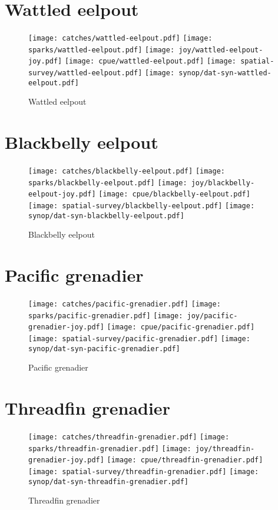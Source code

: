 \section*{Wattled eelpout}

\begin{figure}[htbp]
\centering
\texttt{[image: catches/wattled-eelpout.pdf]}
\texttt{[image: sparks/wattled-eelpout.pdf]}
\texttt{[image: joy/wattled-eelpout-joy.pdf]}
\texttt{[image: cpue/wattled-eelpout.pdf]}
\texttt{[image: spatial-survey/wattled-eelpout.pdf]}
\texttt{[image: synop/dat-syn-wattled-eelpout.pdf]}
\caption{Wattled eelpout}
\end{figure}
\clearpage
\section*{Blackbelly eelpout}

\begin{figure}[htbp]
\centering
\texttt{[image: catches/blackbelly-eelpout.pdf]}
\texttt{[image: sparks/blackbelly-eelpout.pdf]}
\texttt{[image: joy/blackbelly-eelpout-joy.pdf]}
\texttt{[image: cpue/blackbelly-eelpout.pdf]}
\texttt{[image: spatial-survey/blackbelly-eelpout.pdf]}
\texttt{[image: synop/dat-syn-blackbelly-eelpout.pdf]}
\caption{Blackbelly eelpout}
\end{figure}
\clearpage
\section*{Pacific grenadier}

\begin{figure}[htbp]
\centering
\texttt{[image: catches/pacific-grenadier.pdf]}
\texttt{[image: sparks/pacific-grenadier.pdf]}
\texttt{[image: joy/pacific-grenadier-joy.pdf]}
\texttt{[image: cpue/pacific-grenadier.pdf]}
\texttt{[image: spatial-survey/pacific-grenadier.pdf]}
\texttt{[image: synop/dat-syn-pacific-grenadier.pdf]}
\caption{Pacific grenadier}
\end{figure}
\clearpage
\section*{Threadfin grenadier}

\begin{figure}[htbp]
\centering
\texttt{[image: catches/threadfin-grenadier.pdf]}
\texttt{[image: sparks/threadfin-grenadier.pdf]}
\texttt{[image: joy/threadfin-grenadier-joy.pdf]}
\texttt{[image: cpue/threadfin-grenadier.pdf]}
\texttt{[image: spatial-survey/threadfin-grenadier.pdf]}
\texttt{[image: synop/dat-syn-threadfin-grenadier.pdf]}
\caption{Threadfin grenadier}
\end{figure}
\clearpage
